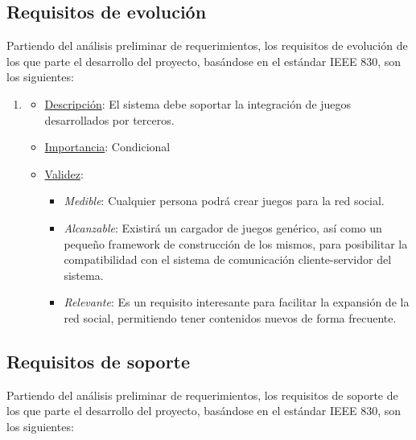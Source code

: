 \subsection{Requisitos de evolución}

Partiendo del análisis preliminar de requerimientos, los requisitos de evolución de los que parte el desarrollo del proyecto, basándose en el estándar IEEE 830, son los siguientes:

\renewcommand{\labelenumi}{\bf EV-\arabic{enumi}}

\begin{enumerate}

\item %
  \begin{itemize}
  \item \underline{Descripción}: El sistema debe soportar la integración de juegos desarrollados por terceros.
  \item \underline{Importancia}: Condicional
  \item \underline{Validez}:
    \begin{itemize}
    \item \textit{Medible}: Cualquier persona podrá crear juegos para la red social.
    \item \textit{Alcanzable}: Existirá un cargador de juegos genérico, así como un pequeño framework de construcción de los mismos, para posibilitar la compatibilidad con el sistema de comunicación cliente-servidor del sistema.
    \item \textit{Relevante}: Es un requisito interesante para facilitar la expansión de la red social, permitiendo tener contenidos nuevos de forma frecuente.
    \end{itemize}
  \end{itemize}

\end{enumerate}

\subsection{Requisitos de soporte}

Partiendo del análisis preliminar de requerimientos, los requisitos de soporte de los que parte el desarrollo del proyecto, basándose en el estándar IEEE 830, son los siguientes:
\renewcommand{\labelenumi}{\bf SO-\arabic{enumi}}

